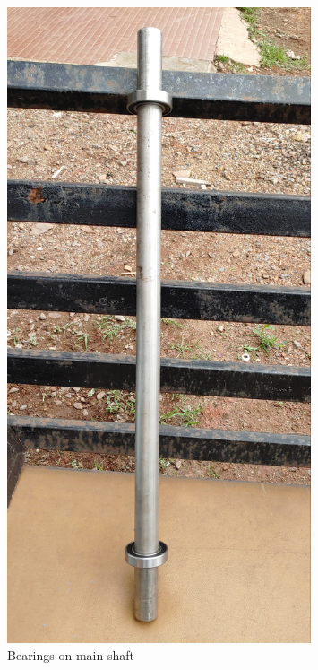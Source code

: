 \begin{figure}[H]
  \centering
    \begin{minipage}{0.23\textwidth}
    \centering
      \includegraphics[width=0.8\textwidth]{bea shaf.jpg}
       \caption{Bearings on main shaft}
    \label{fig:Bearings on main shaft}
    \end{minipage}
\hfill
    \begin{minipage}{0.39\textwidth}
    \centering

\end{minipage}
\end{figure}
